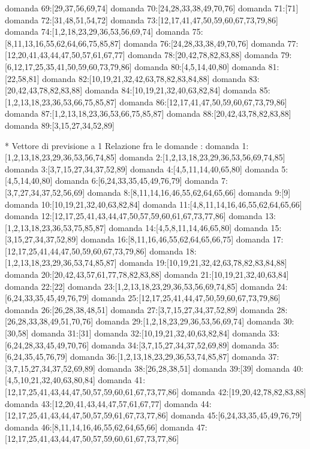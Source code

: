 domanda 69:[29,37,56,69,74]
domanda 70:[24,28,33,38,49,70,76]
domanda 71:[71]
domanda 72:[31,48,51,54,72]
domanda 73:[12,17,41,47,50,59,60,67,73,79,86]
domanda 74:[1,2,18,23,29,36,53,56,69,74]
domanda 75:[8,11,13,16,55,62,64,66,75,85,87]
domanda 76:[24,28,33,38,49,70,76]
domanda 77:[12,20,41,43,44,47,50,57,61,67,77]
domanda 78:[20,42,78,82,83,88]
domanda 79:[6,12,17,25,35,41,50,59,60,73,79,86]
domanda 80:[4,5,14,40,80]
domanda 81:[22,58,81]
domanda 82:[10,19,21,32,42,63,78,82,83,84,88]
domanda 83:[20,42,43,78,82,83,88]
domanda 84:[10,19,21,32,40,63,82,84]
domanda 85:[1,2,13,18,23,36,53,66,75,85,87]
domanda 86:[12,17,41,47,50,59,60,67,73,79,86]
domanda 87:[1,2,13,18,23,36,53,66,75,85,87]
domanda 88:[20,42,43,78,82,83,88]
domanda 89:[3,15,27,34,52,89]


* Vettore di previsione a 1
Relazione fra le domande :
domanda 1:[1,2,13,18,23,29,36,53,56,74,85]
domanda 2:[1,2,13,18,23,29,36,53,56,69,74,85]
domanda 3:[3,7,15,27,34,37,52,89]
domanda 4:[4,5,11,14,40,65,80]
domanda 5:[4,5,14,40,80]
domanda 6:[6,24,33,35,45,49,76,79]
domanda 7:[3,7,27,34,37,52,56,69]
domanda 8:[8,11,14,16,46,55,62,64,65,66]
domanda 9:[9]
domanda 10:[10,19,21,32,40,63,82,84]
domanda 11:[4,8,11,14,16,46,55,62,64,65,66]
domanda 12:[12,17,25,41,43,44,47,50,57,59,60,61,67,73,77,86]
domanda 13:[1,2,13,18,23,36,53,75,85,87]
domanda 14:[4,5,8,11,14,46,65,80]
domanda 15:[3,15,27,34,37,52,89]
domanda 16:[8,11,16,46,55,62,64,65,66,75]
domanda 17:[12,17,25,41,44,47,50,59,60,67,73,79,86]
domanda 18:[1,2,13,18,23,29,36,53,74,85,87]
domanda 19:[10,19,21,32,42,63,78,82,83,84,88]
domanda 20:[20,42,43,57,61,77,78,82,83,88]
domanda 21:[10,19,21,32,40,63,84]
domanda 22:[22]
domanda 23:[1,2,13,18,23,29,36,53,56,69,74,85]
domanda 24:[6,24,33,35,45,49,76,79]
domanda 25:[12,17,25,41,44,47,50,59,60,67,73,79,86]
domanda 26:[26,28,38,48,51]
domanda 27:[3,7,15,27,34,37,52,89]
domanda 28:[26,28,33,38,49,51,70,76]
domanda 29:[1,2,18,23,29,36,53,56,69,74]
domanda 30:[30,58]
domanda 31:[31]
domanda 32:[10,19,21,32,40,63,82,84]
domanda 33:[6,24,28,33,45,49,70,76]
domanda 34:[3,7,15,27,34,37,52,69,89]
domanda 35:[6,24,35,45,76,79]
domanda 36:[1,2,13,18,23,29,36,53,74,85,87]
domanda 37:[3,7,15,27,34,37,52,69,89]
domanda 38:[26,28,38,51]
domanda 39:[39]
domanda 40:[4,5,10,21,32,40,63,80,84]
domanda 41:[12,17,25,41,43,44,47,50,57,59,60,61,67,73,77,86]
domanda 42:[19,20,42,78,82,83,88]
domanda 43:[12,20,41,43,44,47,57,61,67,77]
domanda 44:[12,17,25,41,43,44,47,50,57,59,61,67,73,77,86]
domanda 45:[6,24,33,35,45,49,76,79]
domanda 46:[8,11,14,16,46,55,62,64,65,66]
domanda 47:[12,17,25,41,43,44,47,50,57,59,60,61,67,73,77,86]
